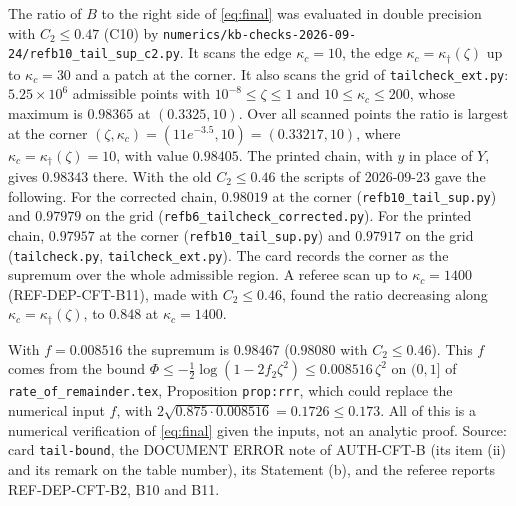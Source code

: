 \documentclass[11pt]{article}
\begin{document}
The ratio of $B$ to the right side of \eqref{eq:final} was evaluated in double precision with
$C_2\le0.47$ (C10) by \texttt{numerics/kb-checks-2026-09-24/refb10\_tail\_sup\_c2.py}.  It scans the
edge $\kappa_c=10$, the edge $\kappa_c=\kappa_\dagger(\zeta)$ up to $\kappa_c=30$ and a patch at the
corner.  It also scans the grid of \texttt{tailcheck\_ext.py}: $5.25\times10^6$ admissible points
with $10^{-8}\le\zeta\le1$ and $10\le\kappa_c\le200$, whose maximum is $0.98365$ at $(0.3325,10)$.
Over all scanned points the ratio is largest at the corner
$(\zeta,\kappa_c)=(11e^{-3.5},10)=(0.33217,10)$, where $\kappa_c=\kappa_\dagger(\zeta)=10$, with value
$0.98405$.  The printed chain, with $y$ in place of $Y$, gives $0.98343$ there.  With the old
$C_2\le0.46$ the scripts of 2026-09-23 gave the following.  For the corrected chain, $0.98019$ at
the corner (\texttt{refb10\_tail\_sup.py}) and $0.97979$ on the grid
(\texttt{refb6\_tailcheck\_corrected.py}).  For the printed chain, $0.97957$ at the corner
(\texttt{refb10\_tail\_sup.py}) and $0.97917$ on the grid (\texttt{tailcheck.py},
\texttt{tailcheck\_ext.py}).  The card records the corner as the supremum over the whole admissible
region.  A referee scan up to $\kappa_c=1400$ (REF-DEP-CFT-B11), made with $C_2\le0.46$, found the
ratio decreasing along $\kappa_c=\kappa_\dagger(\zeta)$, to $0.848$ at $\kappa_c=1400$.

With $f=0.008516$ the supremum is $0.98467$ ($0.98080$ with $C_2\le0.46$).  This $f$ comes from the bound
$\Phi\le-\frac12\log(1-2f_2\zeta^2)\le0.008516\,\zeta^2$ on $(0,1]$ of \texttt{rate\_of\_remainder.tex},
Proposition \texttt{prop:rrr}, which could replace the numerical input $f$, with
$2\sqrt{0.875\cdot0.008516}=0.1726\le0.173$.  All of this is a numerical verification of
\eqref{eq:final} given the inputs, not an analytic proof.  Source: card \texttt{tail-bound}, the
DOCUMENT ERROR note of AUTH-CFT-B (its item (ii) and its remark on the table number), its Statement
(b), and the referee reports REF-DEP-CFT-B2, B10 and B11.
\end{document}
